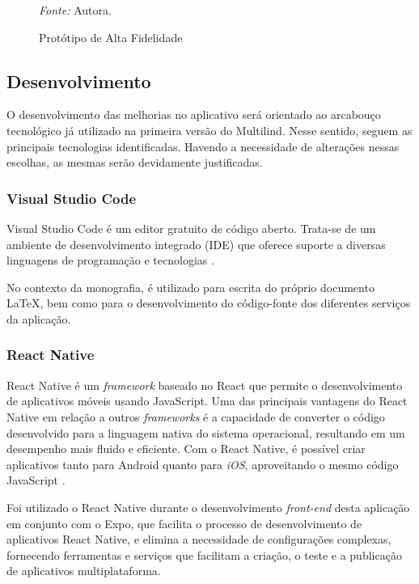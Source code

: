 \begin{figure}[h!]
	\centering
	\caption{Protótipo de Alta Fidelidade}
    \begin{tablenotes}[flushleft]
		\centering
		\item \textit{Fonte:} Autora.
	\end{tablenotes}
	\label{fig03}
\end{figure}

\subsection{Desenvolvimento}
\label{sec:Desenvolvimento}
O desenvolvimento das melhorias no aplicativo será orientado ao arcabouço tecnológico já utilizado na primeira versão do Multilind. Nesse sentido, seguem as 
principais tecnologias identificadas. Havendo a necessidade de alterações nessas escolhas, as mesmas serão devidamente justificadas.

\subsubsection{Visual Studio Code}
\label{sec:Visual Studio Code}
Visual Studio Code é um editor gratuito de código aberto. Trata-se de um ambiente de desenvolvimento 
integrado (IDE) que oferece suporte a diversas linguagens de programação e tecnologias \cite{vscode}.

No contexto da monografia, é utilizado para escrita do próprio documento LaTeX, bem como para o desenvolvimento do código-fonte 
dos diferentes serviços da aplicação.

\subsubsection{React Native}
\label{sec:React Native}
React Native é um \textit{framework} baseado no React que permite o desenvolvimento de aplicativos móveis usando JavaScript. Uma das 
principais vantagens do React Native em relação a outros \textit{frameworks} é a capacidade de converter o código desenvolvido para a 
linguagem nativa do sistema operacional, resultando em um desempenho mais fluido e eficiente. Com o React Native, é possível 
criar aplicativos tanto para Android quanto para \textit{iOS}, aproveitando o mesmo código JavaScript \cite{reactnative}.

Foi utilizado o React Native durante o desenvolvimento \textit{front-end} desta aplicação em conjunto com o Expo, que facilita 
o processo de desenvolvimento de aplicativos React Native, e elimina a necessidade de configurações complexas, fornecendo ferramentas 
e serviços que facilitam a criação, o teste e a publicação de aplicativos multiplataforma.

